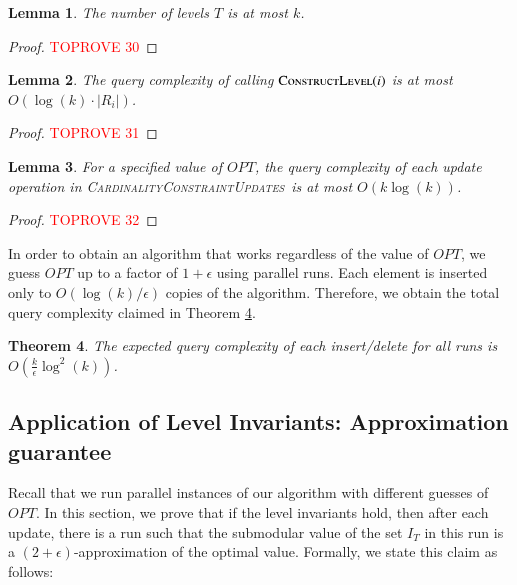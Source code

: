 \documentclass[11pt]{article}
\newtheorem{theorem}{Theorem}
\newtheorem{lemma}[theorem]{Lemma}
\newcommand{\mO}{O}
\newcommand{\constLevel}{\textsc{ConstructLevel}}
\newcommand{\carupdates}{\textsc{CardinalityConstraintUpdates}}
\begin{document}
\begin{lemma}
\label{lm:cardinality:number_of_levels}
  The number of levels $T$ is at most $k$.
\end{lemma}
\begin{proof}\textcolor{red}{TOPROVE 30}\end{proof}


\begin{lemma}
\label{lm:cardinality:level_query_complexity}
  The query complexity of calling $\constLevel{}(i)$ is at most
  $\mO\left(\log\left(k\right)\cdot|R_i|\right)$.
\end{lemma}
\begin{proof}\textcolor{red}{TOPROVE 31}\end{proof}


\begin{lemma}
  For a specified value of $OPT$, the query complexity of each update operation in \carupdates~is at most
  $\mO\left(k\log\left(k\right)\right)$.
\end{lemma}
\begin{proof}\textcolor{red}{TOPROVE 32}\end{proof}

In order to obtain an algorithm that works regardless of the value of $OPT$, we guess $OPT$ up to a factor of $1+\epsilon$ using parallel runs.
Each element is inserted only to $\mO(\log(k)/\epsilon)$ copies of the algorithm. Therefore, we obtain the total query complexity claimed in Theorem \ref{thm:cardinality:query_complexity}.

\begin{theorem}
\label{thm:cardinality:query_complexity}
The expected query complexity of each insert/delete for all runs is $\mO\left(\frac{k}{\epsilon}\log^2\left(k\right)\right)$.
\end{theorem}



\subsection{Application of Level Invariants: Approximation guarantee}

Recall that we run parallel instances of our algorithm with different guesses of $OPT$.
In this section, we prove that if the level invariants hold, then after each update, there is a run such that the submodular value of the set $I_T$ in this run is a $(2+\epsilon)$-approximation 
of the optimal value. Formally, we state this claim as follows: 
\end{document}
